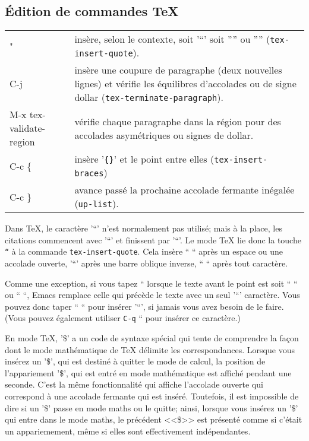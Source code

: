 \subsection{\'Edition de commandes \TeX{}}

\begin{center}
  \begin{tabular}[m]{>{\ttfamily}lp{.8\linewidth}}
    " & insère, selon le contexte, soit '``' soit  '''' ou ''''
    (\texttt{tex-insert-quote}). \\
    C-j & insère une coupure de paragraphe (deux nouvelles lignes) et
    vérifie les équilibres d'accolades ou de signe dollar
    (\texttt{tex-terminate-paragraph}). \\
    M-x tex-validate-region & vérifie chaque paragraphe dans la région
    pour des accolades asymétriques
    ou signes de dollar.\\
    C-c \{ & insère '\texttt{\{\}}' et
      le point entre elles
      (\texttt{tex-insert-braces})
      \\
    C-c \} & avance passé la
  prochaine accolade fermante
  inégalée (\texttt{up-list}).
  \end{tabular}
\end{center}

Dans \TeX{}, le caractère '``' n'est
normalement pas utilisé; mais à la
place, les citations commencent avec
'``' et finissent par '``'. Le mode \TeX{}
lie donc la touche \texttt{``} à la
commande
\texttt{tex-insert-quote}. Cela
insère `` `` après un espace ou une
accolade ouverte, '``' après une
barre oblique inverse, `` `` après
tout caractère.

Comme une exception, si vous tapez
`` lorsque le texte avant le point
est soit `` `` ou `` ``, Emacs
remplace celle qui précède le texte
avec un seul '``' caractère. Vous
pouvez donc taper `` `` pour insérer
'``', si jamais vous avez besoin de
le faire. (Vous pouvez également
utiliser \texttt{C-q} `` pour
insérer ce caractère.)

En mode \TeX{}, '\$' a un code de
syntaxe spécial qui tente de
comprendre la façon dont le mode
mathématique de \TeX{} délimite les
correspondances. Lorsque vous
insérez un '\$', qui est destiné à
quitter le mode de calcul, la
position de l'appariement '\$', qui
est entré en mode mathématique est
affiché pendant une seconde. C'est
la même fonctionnalité qui affiche
l'accolade ouverte qui correspond à
une accolade fermante qui est
inséré. Toutefois, il est impossible
de dire si un '\$' passe en mode
maths ou le quitte; ainsi, lorsque
vous insérez un '\$' qui entre dans
le mode maths, le précédent <<\$>>
est présenté comme si c'était un
appariemement, même si elles sont
effectivement indépendantes.

